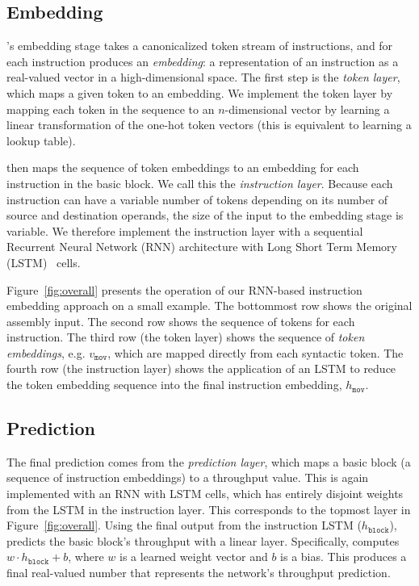 \subsection{Embedding}
\label{sec:nnembeddings}

{\tool}'s embedding stage takes a canonicalized token stream of instructions, and for each instruction produces an \emph{embedding}: a representation of an instruction as a real-valued vector in a high-dimensional space.
The first step is the \textit{token layer}, which maps a given token to an embedding.
We implement the token layer by mapping each token in the sequence to an $n$-dimensional vector by learning a linear transformation of the one-hot token vectors (this is equivalent to learning a lookup table).

\tool{} then maps the sequence of token embeddings to an embedding for each instruction in the basic block.
We call this the \textit{instruction layer}.
Because each instruction can have a variable number of tokens depending on its number of source and destination operands, the size of the input to the embedding stage is variable.
We therefore implement the instruction layer with a sequential Recurrent Neural Network (RNN) architecture with Long Short Term Memory (LSTM)~\cite{lstm} cells.

Figure~\ref{fig:overall} presents the operation of our RNN-based instruction embedding approach on a small example.
The bottommost row shows the original assembly input.
The second row shows the sequence of tokens for each instruction.
The third row (the token layer) shows the sequence of {\em token embeddings}, e.g. $v_\texttt{mov}$, which are mapped directly from each syntactic token.
The fourth row (the instruction layer) shows the application of an LSTM to reduce the token embedding sequence into the final instruction embedding, $h_{\texttt{mov}}$.

\subsection{Prediction}
\label{sec:nnoverview}

The final prediction comes from the \textit{prediction layer}, which maps a basic block (a sequence of instruction embeddings) to a throughput value.
This is again implemented with an RNN with LSTM cells, which has entirely disjoint weights from the LSTM in the instruction layer.
This corresponds to the topmost layer in Figure~\ref{fig:overall}.
Using the final output from the instruction LSTM ($h_{\texttt{block}}$), \tool{} predicts the basic block's throughput with a linear layer.
Specifically, {\tool} computes $w \cdot h_{\texttt{block}} + b$, where $w$ is a learned weight vector and $b$ is a bias.
This produces a final real-valued number that represents the network's throughput prediction.

